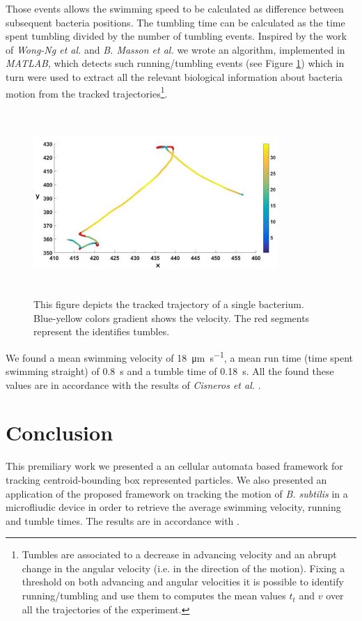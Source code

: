 \documentclass[conference]{IEEEtran}
\begin{document}
Those events allows the swimming speed to be calculated as difference between subsequent bacteria positions.
The tumbling time can be calculated as the time spent tumbling divided by the number of tumbling events. 
Inspired by the work of \textit{Wong-Ng et al.} \cite{Wong2016} and \textit{B. Masson et al.} \cite{Masson:2011} we wrote an algorithm, implemented in \textit{MATLAB}, which detects such running/tumbling events (see Figure \ref{runtumbledetection}) which in turn were used to extract all the relevant biological information about bacteria motion from the tracked trajectories\footnote{Tumbles are associated to a decrease in advancing velocity and an abrupt change in the angular velocity (i.e. in the direction of the motion). Fixing a threshold on both advancing and angular velocities it is possible to identify running/tumbling and use them to computes the mean values $t_t$ and $v$ over all the trajectories of the experiment.}.
    \begin{figure}[htp]
         \includegraphics[width=9.3cm,height=7cm]{./images/runtumble.png}
        \caption{This figure depicts the tracked trajectory of a single bacterium. Blue-yellow colors gradient shows the velocity. The red segments represent the identifies tumbles.}
        \label{runtumbledetection}
    \end{figure}

We found a mean swimming velocity of  \SI{18}{\micro\meter \per \second}, a mean run time (time spent swimming straight) of \SI{0.8}{\second} and a tumble time of \SI{0.18}{\second}. 
All the found these values are in accordance with the results of \textit{Cisneros et al.} \cite{Cisneros:2011}.

\section{Conclusion}
This premiliary work we presented a an cellular automata based framework for tracking centroid-bounding box represented particles. 
We also presented an application of the proposed framework on tracking the motion of \textit{B. subtilis} in a microfliudic device in order to retrieve the average swimming velocity, running and tumble times. The results are in accordance with \cite{Cisneros:2011}. 
\end{document}
